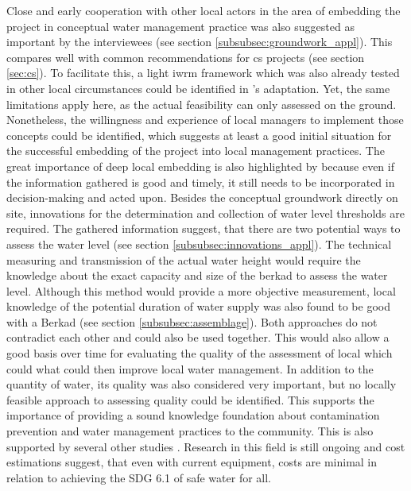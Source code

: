Close and early cooperation with other local actors in the area of embedding the project in conceptual water management practice was also suggested as important by the interviewees (see section \ref{subsubsec:groundwork_appl}). This compares well with common recommendations for \acrshort{cs} projects (see section \ref{sec:cs}). To facilitate this, a light \acrshort{iwrm} framework which was also already tested in other local circumstances could be identified in \autocite{dayCommunitybasedWaterResources2009}'s adaptation. Yet, the same limitations apply here, as the actual feasibility can only assessed on the ground. Nonetheless, the willingness and experience of local managers to implement those concepts could be identified, which suggests at least a good initial situation for the successful embedding of the project into local management practices. The great importance of deep local embedding is also highlighted by \autocite{gualazziniEWEAEarlyWarning2021} because even if the information gathered is good and timely, it still needs to be incorporated in decision-making and acted upon.\newline
Besides the conceptual groundwork directly on site, innovations for the determination and collection of water level thresholds are required. The gathered information suggest, that there are two potential ways to assess the water level (see section \ref{subsubsec:innovations_appl}). The technical measuring and transmission of the actual water height would require the knowledge about the exact capacity and size of the berkad to assess the water level. Although this method would provide a more objective measurement, local knowledge of the potential duration of water supply was also found to be good with a Berkad (see section \ref{subsubsec:assemblage}). Both approaches do not contradict each other and could also be used together. This would also allow a good basis over time for evaluating the quality of the assessment of local which could what could then improve local water management. In addition to the quantity of water, its quality was also considered very important, but no locally feasible approach to assessing quality could be identified. This supports the importance of providing a sound knowledge foundation about contamination prevention and water management practices to the community. This is also supported by several other studies \autocite{danielAssessingDrinkingWater2020,huangManagementDrinkingWater2020,tariqOpenSourceWater2021,wmoPlanningWaterqualityMonitoring2013}. Research in this field is still ongoing \autocite{tariqOpenSourceWater2021} and \autocite{delaireHowMuchWill2017} cost estimations suggest, that even with current equipment, costs are minimal in relation to achieving the SDG 6.1 of safe water for all.\newline
